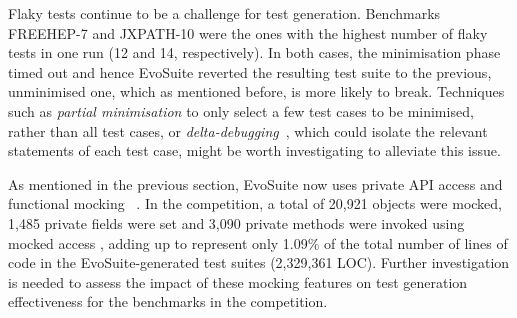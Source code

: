 \documentclass[10pt,conference]{IEEEtran}
\newcommand{\EVOSUITE}{{\sc EvoSuite}\xspace}
\newcommand{\TODO}[1]{\sethlcolor{yellow}\textbf{\textcolor{ScarletRed}{\hl{TODO: #1}}}\xspace}
\begin{document}

Flaky tests continue to be a challenge for test generation. Benchmarks
FREEHEP-7 and JXPATH-10 were the ones with the highest number of flaky
tests in one run (12 and 14, respectively). In both cases, the
minimisation phase timed out and hence \EVOSUITE reverted the
resulting test suite to the previous, unminimised one, which as
mentioned before, is more likely to break. Techniques such as
\textit{partial minimisation} to only select a few test cases to be
minimised, rather than all test cases, or
\textit{delta-debugging}~\cite{zellerdd}, which could isolate the
relevant statements of each test case, might be worth investigating
to alleviate this issue.

As mentioned in the previous section, \EVOSUITE now uses private
API access and functional mocking%
~\cite{ICST_Mocking17}. In the competition, a total of 20,921
objects were mocked, 1,485 private fields were set and 3,090 private methods
were invoked using mocked access%
, adding up to represent only 1.09\% of the total number of lines of code
in the \EVOSUITE-generated test suites (2,329,361 LOC). Further
investigation is needed to assess the impact of these mocking features
on test generation effectiveness for the benchmarks in the
competition.
\end{document}
